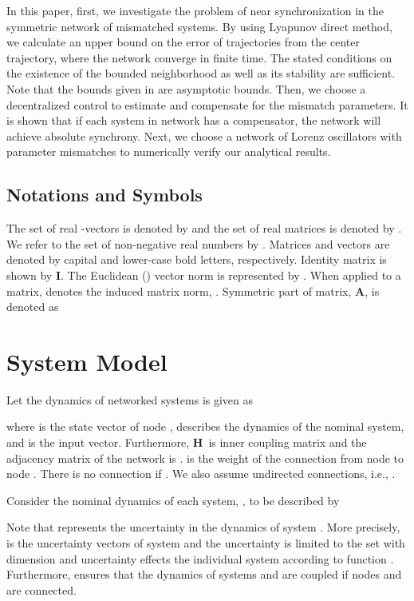 \documentclass[conference]{IEEEtran}
\def\bA{\mbox{{\bf A}}}
\def\bH{\mbox{{\bf H}}}
\def\bI{\mbox{{\bf I}}}
\begin{document}
In this paper, first, we investigate the problem of near synchronization in the symmetric network of mismatched systems. By using Lyapunov direct method, we calculate an upper bound on the error of trajectories from the center trajectory, where the network converge in finite time. The stated conditions on the existence of the bounded neighborhood as well as its stability are sufficient. Note that the bounds given in \cite{Sun09, Sorrentino11,Acharyya12,Manaffam15} are asymptotic bounds. Then, we choose a decentralized control to estimate and compensate for the mismatch parameters. It is shown that if each system in network has a compensator, the network will achieve absolute synchrony. Next, we choose a network of Lorenz oscillators with parameter mismatches to numerically verify our analytical results.

\subsection{Notations and Symbols}
The set of real -vectors is denoted by  and the set of real  matrices is denoted by . We refer to the set of non-negative real numbers by . Matrices and vectors are denoted by capital and lower-case bold letters, respectively. Identity matrix is shown by \bI. The Euclidean () vector norm is represented by . When applied to a matrix,  denotes the  induced matrix norm, . Symmetric part of matrix, \bA, is denoted as 

\section{System Model}
	Let the dynamics of networked systems is given as 
		
		where  is the state vector of node ,  describes the dynamics of the nominal system, and  is the input vector. Furthermore, \bH~is inner coupling matrix and the adjacency matrix of the network is .   is the weight of the connection from node  to node . There is no connection if . We also assume undirected connections, i.e., .
		
 	Consider the nominal dynamics of each system, , to be described by
	
	
	
	Note that  represents the uncertainty in the dynamics of system . More precisely,  is the uncertainty vectors of system  and the uncertainty is limited to the set  with dimension  and uncertainty effects the individual system according to function .  Furthermore,  ensures that the dynamics of systems  and  are coupled if nodes  and  are connected. 
	
\end{document}
